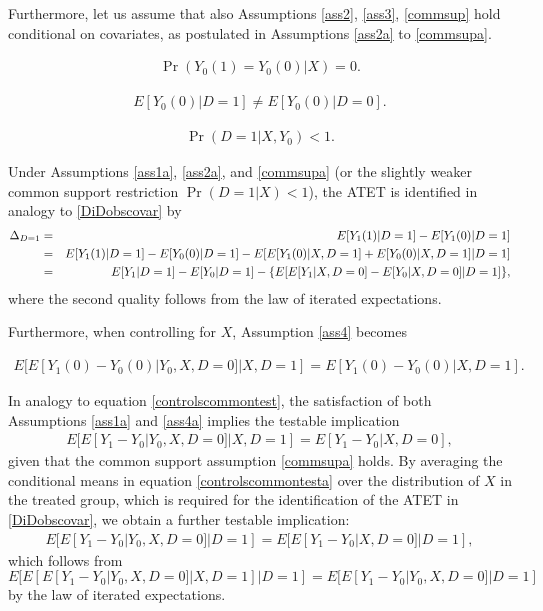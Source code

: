 {	Furthermore, let us assume that also Assumptions \ref{ass2}, \ref{ass3}, \ref{commsup} hold conditional on covariates, as postulated in Assumptions \ref{ass2a} to \ref{commsupa}.
	\begin{assumption}\label{ass2a}
		\begin{eqnarray*}
			\Pr(Y_0(1)=Y_0(0)|X)=0.
		\end{eqnarray*}
	\end{assumption}
	\begin{assumption}\label{ass3a}
		\begin{eqnarray*}
			E[Y_0(0)|D=1]\neq E[Y_0(0)|D=0].
		\end{eqnarray*}
	\end{assumption}
	\begin{assumption}\label{commsupa}
		\begin{eqnarray*}
			\Pr(D=1|X,Y_0)<1.
		\end{eqnarray*}
	\end{assumption}
	Under Assumptions \ref{ass1a}, \ref{ass2a}, and \ref{commsupa} (or the slightly weaker common support restriction $\Pr(D=1|X)<1$), the ATET is identified in analogy to \eqref{DiDobscovar} by
	\begin{eqnarray}\label{DiDobscovar}
		\Delta_{D=1}&=&E[Y_1(1)|D=1]-E[Y_1(0)|D=1]\notag\\
		&=&E[Y_1(1)|D=1]-E[Y_0(0)|D=1]-E[E[Y_1(0)|X,D=1]+E[Y_0(0)|X,D=1]|D=1]\notag\\
		&=&E[Y_1|D=1]-E[Y_0|D=1]-\{E[E[Y_1|X,D=0]-E[Y_0|X,D=0]|D=1]\},
	\end{eqnarray}
	where the second quality follows from the law of iterated expectations.
	
	Furthermore, when controlling for $X$, Assumption \ref{ass4} becomes
	\begin{assumption}\label{ass4a}
		\begin{eqnarray*}
			E[E[Y_1(0)-Y_0(0)|Y_0,X,D=0]|X,D=1]=E[Y_1(0)-Y_0(0)|X,D=1].
		\end{eqnarray*}
	\end{assumption}
	In analogy to equation \eqref{controlscommontest}, the satisfaction of both Assumptions \ref{ass1a} and \ref{ass4a} implies the testable implication
	\begin{eqnarray}\label{controlscommontesta}
		E[E[Y_1-Y_0|Y_0,X,D=0]|X,D=1]=E[Y_1-Y_0|X,D=0],
	\end{eqnarray}
	given that the common support assumption \ref{commsupa} holds. By averaging the conditional means in equation \eqref{controlscommontesta} over the distribution of $X$ in the treated group, which is required for the identification of the ATET in \eqref{DiDobscovar}, we obtain a further testable implication:
	\begin{eqnarray}\label{controlscommontestb}
		E[E[Y_1-Y_0|Y_0,X,D=0]|D=1]=E[E[Y_1-Y_0|X,D=0]|D=1],
	\end{eqnarray}
	which follows from $E[E[E[Y_1-Y_0|Y_0,X,D=0]|X,D=1]|D=1]=E[E[Y_1-Y_0|Y_0,X,D=0]|D=1]$ by the law of iterated expectations.
	
}
